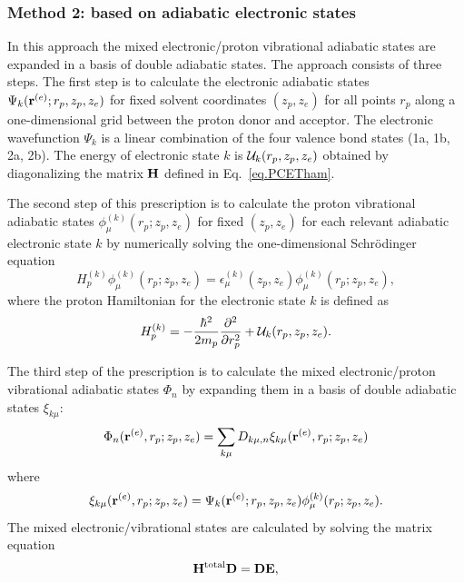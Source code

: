 \documentclass[oneside,11pt,openany]{book}
\begin{document}
\subsubsection{Method 2: based on adiabatic electronic states}
In this approach the mixed electronic/proton
vibrational adiabatic states are expanded in a basis of
double adiabatic states. The approach consists of three steps.
The first step is to calculate the electronic
adiabatic states $\Psi_k({\bf r}^{(e)};r_p,z_p,z_e)$ 
for fixed solvent
coordinates $(z_p,z_e)$ for all points $r_p$ along a one-dimensional grid
between the proton donor and acceptor.
The electronic wavefunction
$\Psi_k$ is a linear combination of
the four valence bond states (1a, 1b, 2a, 2b).
The energy of electronic state $k$ is
${\cal U}_k(r_p,z_p,z_e)$ obtained by diagonalizing
the matrix ${\bf H}$ defined in Eq.~\ref{eq.PCETham}.
\par
The second step of this prescription is to calculate the proton
vibrational adiabatic states $\phi_\mu^{(k)}(r_p;z_p,z_e)$
for fixed $(z_p,z_e)$
for each relevant adiabatic electronic state $k$ by numerically solving
the one-dimensional Schr\"odinger equation
\begin{equation}
H_p^{(k)} \phi_{\mu}^{(k)}(r_p;z_p,z_e)=
\epsilon_{\mu}^{(k)}(z_p,z_e) \phi_\mu^{(k)}(r_p;z_p,z_e),
\label{eq.pcetpts}
\end{equation}
where the proton Hamiltonian for the electronic state $k$ is defined as
\begin{equation}
H_p^{(k)}=-\frac{\hbar^2}{2m_p}\frac{\partial^2}{\partial r_p^2}
+{\cal U}_k(r_p,z_p,z_e).
\label{eq.protham}
\end{equation}
\par
The third step of the prescription is
to calculate the
mixed electronic/proton vibrational adiabatic states $\Phi_n$ by expanding them
in a basis of double adiabatic states $\xi_{k\mu }$:
\begin{equation}
\Phi_n({\bf r}^{(e)},r_p;z_p,z_e)=\sum_{k\mu} 
D_{k\mu,n} \xi_{k\mu}({\bf r}^{(e)},r_p;z_p,z_e)
\end{equation}
where
\begin{equation}
\xi_{k\mu}({\bf r}^{(e)},r_p;z_p,z_e)
=\Psi_k({\bf r}^{(e)};r_p,z_p,z_e) \phi_\mu^{(k)}(r_p;z_p,z_e).
\label{basisfunc}
\end{equation}
The mixed electronic/vibrational states are calculated by
solving the matrix equation
\begin{equation}
{\bf H}^{\rm total} {\bf D}={\bf D}{\bf E},
\end{equation}
\end{document}
